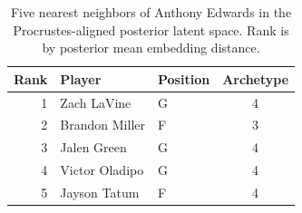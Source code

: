\begin{table}[htbp]
  \centering\small
  \begin{tabular}{rllc}
    \toprule
    Rank & Player & Position & Archetype \\
    \midrule
    1 & Zach LaVine & G & 4 \\
    2 & Brandon Miller & F & 3 \\
    3 & Jalen Green & G & 4 \\
    4 & Victor Oladipo & G & 4 \\
    5 & Jayson Tatum & F & 4 \\
    \bottomrule
  \end{tabular}
  \caption{Five nearest neighbors of Anthony Edwards in the Procrustes-aligned posterior latent space. Rank is by posterior mean embedding distance.}
  \label{tab:Anthony_Edwards_neighbors}
\end{table}

